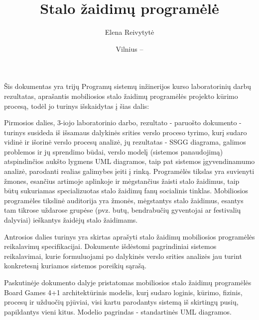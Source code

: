 \documentclass{VUMIFPSkursinis}
\title{Stalo žaidimų programėlė}
\author{Elena Reivytytė}
\date{Vilnius – \the\year}
\begin{document}
\maketitle

Šis dokumentas yra trijų Programų sistemų inžinerijos kurso laboratorinių darbų rezultatas, aprašantis
mobiliosios stalo žaidimų programėlės projekto kūrimo procesą, todėl jo turinys išskaidytas į šias dalis:

Pirmosios dalies, 3-iojo laboratorinio darbo, rezultato - paruošto dokumento  - turinys susideda iš išsamaus dalykinės srities verslo proceso tyrimo, kurį sudaro vidinė ir išorinė verslo procesų analizė, jų rezultatas - SSGG diagrama,  galimos problemos ir jų sprendimo būdai, verslo modelį (sistemos panaudojimą) atspindinčios aukšto lygmens UML diagramos, taip pat sistemos įgyvendinamumo analizė, parodanti realias galimybes įeiti į rinką. Programėlės tikslas yra suvienyti žmones, esančius artimoje aplinkoje ir mėgstančius žaisti stalo žaidimus, taip būtų sukuriamas specializuotas stalo žaidimų fanų socialinis tinklas. Mobiliosios programėles tikslinė auditorija yra žmonės, mėgstantys stalo žaidimus, esantys tam tikrose uždarose grupėse (pvz. butų, bendrabučių gyventojai ar festivalių dalyviai) ieškantys žaidėjų stalo žaidimams. 

Antrosios dalies turinys yra skirtas aprašyti stalo žaidimų mobiliosios programėlės reikalavimų specifikacijai. Dokumente išdėstomi pagrindiniai sistemos reikalavimai, kurie formuluojami po dalykinės verslo srities analizės jau turint konkretesnį kuriamos sistemos poreikių sąrašą.

Paskutinėje dokumento dalyje pristatomas mobiliosios stalo žaidimų programėlės Board Games 4+1 architektūrinis modelis, kurį sudaro loginis, kūrimo, fizinis, procesų ir užduočių pjūviai, visi kartu parodantys sistemą iš skirtingų pusių, papildantys vieni kitus. Modelio pagrindas - standartinės UML diagramos.

\tableofcontents
\end{document}
